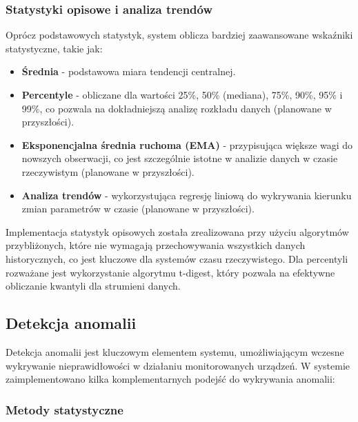 \subsubsection{Statystyki opisowe i analiza trendów}
\label{subsubsec:statystyki_opisowe}

Oprócz podstawowych statystyk, system oblicza bardziej zaawansowane wskaźniki statystyczne, takie jak:

\begin{itemize}
    \item \textbf{Średnia} - podstawowa miara tendencji centralnej.
    \item \textbf{Percentyle} - obliczane dla wartości 25\%, 50\% (mediana), 75\%, 90\%, 95\% i 99\%, co pozwala na dokładniejszą analizę rozkładu danych (planowane w przyszłości).
    \item \textbf{Eksponencjalna średnia ruchoma (EMA)} - przypisująca większe wagi do nowszych obserwacji, co jest szczególnie istotne w analizie danych w czasie rzeczywistym (planowane w przyszłości).
    \item \textbf{Analiza trendów} - wykorzystująca regresję liniową do wykrywania kierunku zmian parametrów w czasie (planowane w przyszłości).
\end{itemize}

Implementacja statystyk opisowych została zrealizowana przy użyciu algorytmów przybliżonych, które nie wymagają przechowywania wszystkich danych historycznych, co jest kluczowe dla systemów czasu rzeczywistego. Dla percentyli rozważane jest wykorzystanie algorytmu t-digest, który pozwala na efektywne obliczanie kwantyli dla strumieni danych.

\subsection{Detekcja anomalii}
\label{subsec:detekcja_anomalii}

Detekcja anomalii jest kluczowym elementem systemu, umożliwiającym wczesne wykrywanie nieprawidłowości w działaniu monitorowanych urządzeń. W systemie zaimplementowano kilka komplementarnych podejść do wykrywania anomalii:

\subsubsection{Metody statystyczne}
\label{subsubsec:metody_statystyczne}


